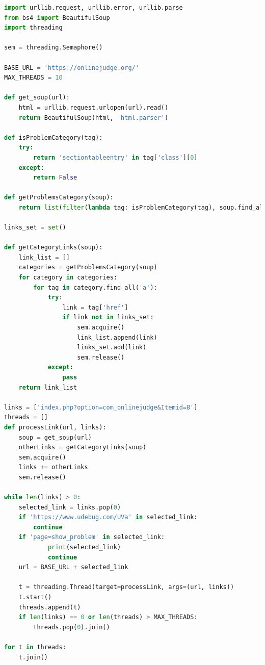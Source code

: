 \begin{apendicesenv}
\begin{lstlisting}[language=Python]
import urllib.request, urllib.error, urllib.parse
from bs4 import BeautifulSoup
import threading

sem = threading.Semaphore()

BASE_URL = 'https://onlinejudge.org/'
MAX_THREADS = 10

def get_soup(url):
    html = urllib.request.urlopen(url).read()
    return BeautifulSoup(html, 'html.parser')

def isProblemCategory(tag):
    try:
        return 'sectiontableentry' in tag['class'][0]
    except:
        return False

def getProblemsCategory(soup):
    return list(filter(lambda tag: isProblemCategory(tag), soup.find_all('tr')))

links_set = set()

def getCategoryLinks(soup):
    link_list = []
    categories = getProblemsCategory(soup)
    for category in categories:
        for tag in category.find_all('a'):
            try:
                link = tag['href']
                if link not in links_set:
                    sem.acquire()
                    link_list.append(link)
                    links_set.add(link)
                    sem.release()
            except:
                pass
    return link_list

links = ['index.php?option=com_onlinejudge&Itemid=8']
threads = []
def processLink(url, links):
    soup = get_soup(url)
    otherLinks = getCategoryLinks(soup)
    sem.acquire()
    links += otherLinks
    sem.release()

while len(links) > 0:
    selected_link = links.pop(0)
    if 'https://www.udebug.com/UVa' in selected_link:
        continue
    if 'page=show_problem' in selected_link:
            print(selected_link)
            continue
    url = BASE_URL + selected_link

    t = threading.Thread(target=processLink, args=(url, links))
    t.start()
    threads.append(t)
    if len(links) == 0 or len(threads) > MAX_THREADS:
        threads.pop(0).join()

for t in threads:
    t.join()
    
\end{lstlisting}

\end{apendicesenv}
